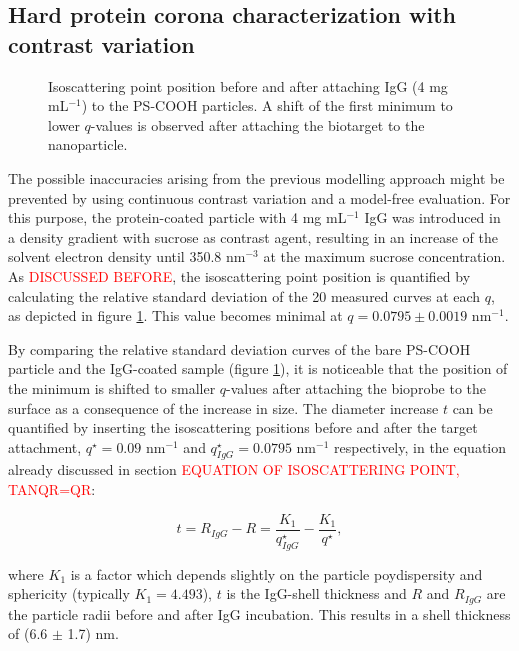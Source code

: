\subsection{Hard protein corona characterization with contrast variation}

\begin{figure}
	\centering
		
		\caption{Isoscattering point position before and after attaching IgG (4 mg mL$^{-1}$) to the PS-COOH particles. A shift of the first minimum to lower $q$-values is observed after attaching the biotarget to the nanoparticle.}
		\label{fig:CoatedKiskerIsopointComp}
\end{figure}

The possible inaccuracies arising from the previous modelling approach might be prevented by using continuous contrast variation and a model-free evaluation. For this purpose, the protein-coated particle with 4 mg mL$^{-1}$ IgG was introduced in a density gradient with sucrose as contrast agent, resulting in an increase of the solvent electron density until 350.8 nm$^{-3}$ at the maximum sucrose concentration. As \textcolor{red}{DISCUSSED BEFORE}, the isoscattering point position is quantified by calculating the relative standard deviation of the 20 measured curves at each $q$, as depicted in figure \ref{fig:CoatedKiskerIsopointComp}. This value becomes minimal at $q=0.0795\pm0.0019$ nm$^{-1}$.

By comparing the relative standard deviation curves of the bare PS-COOH particle \cite{garcia-diez_nanoparticle_2015} and the IgG-coated sample (figure \ref{fig:CoatedKiskerIsopointComp}), it is noticeable that the position of the minimum is shifted to smaller $q$-values after attaching the bioprobe to the surface as a consequence of the increase in size. The diameter increase $t$ can be quantified by inserting the isoscattering positions before and after the target attachment, $q^{\star}=0.09$ nm$^{-1}$ and $q^{\star}_{IgG}=0.0795$ nm$^{-1}$ respectively, in the equation already discussed in section  \textcolor{red}{EQUATION OF ISOSCATTERING POINT, TANQR=QR}:


\begin{equation}
t = R_{IgG} - R = \frac{K_1}{q^{\star}_{IgG}}-\frac{K_1}{q^{\star}} ,
\label{eq:IsopointRadiusDifference}
\end{equation}

where $K_1$ is a factor which depends slightly on the particle poydispersity and sphericity (typically $K_1 = 4.493$), $t$ is the IgG-shell thickness and $R$ and $R_{IgG}$ are the particle radii before and after IgG incubation. This results in a shell thickness of (6.6 $\pm$ 1.7) nm. 

